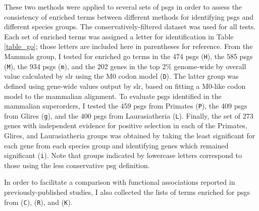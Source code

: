 These two methods were applied to several sets of \acp{psg} in order
to assess the consistency of enriched terms between different methods
for identifying \acp{psg} and different species groups. The
conservatively-filtered dataset was used for all tests. Each set of
enriched terms was assigned a letter for identification in Table
\ref{table_go}; those letters are included here in parentheses for
reference. From the Mammals group, I tested for enriched \ac{go} terms
in the 474 \psghoch \acp{psg} (\texttt{H}), the 585 \psgeone \acp{psg}
(\texttt{M}), the 934 \psgefive \acp{psg} (\texttt{m}), and the 202
genes in the top 2\% genome-wide by overall \dnds value calculated by
\ac{slr} using the M0 codon model (\texttt{D}). The latter group was
defined using gene-wide \dnds values output by \ac{slr}, based on
fitting a M0-like codon model to the mammalian alignment. To evaluate
\acp{psg} identified in the mammalian superorders, I tested the 459
\psgeone \acp{psg} from Primates (\texttt{P}), the 409 \psgefive
\acp{psg} from Glires (\texttt{g}), and the 400 \psgeone \acp{psg}
from Laurasiatheria (\texttt{L}). Finally, the set of 273 genes with
independent evidence for positive selection in each of the Primates,
Glires, and Laurasiatheria groups was obtained by taking the least
significant \psgefive \pv for each gene from each species group and
identifying genes which remained significant (\texttt{i}). Note that
groups indicated by lowercase letters correspond to those using the
less conservative \psgefive \ac{psg} definition.

In order to facilitate a comparison with functional associations
reported in previously-published studies, I also collected the lists
of terms enriched for \acp{psg} from \citet{Clark2003} (\texttt{C}),
\citet{Macaque2007} (\texttt{R}), and \citet{Kosiol2008} (\texttt{K}).

